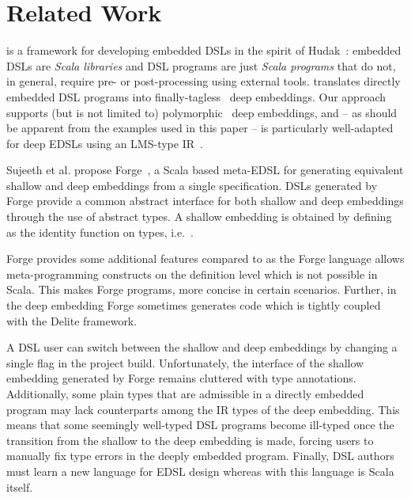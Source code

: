 \section{Related Work}
\label{sec:related-work}

\yy is a framework for developing embedded DSLs in the spirit of
Hudak~\cite{Hudak96csur,Hudak98sr}: embedded DSLs are \emph{Scala
  libraries} and DSL programs are just \emph{Scala programs} that do
not, in general, require pre- or post-processing using external tools.
\yy translates directly embedded DSL programs into
finally-tagless~\cite{carette_finally_2009} deep embeddings.  Our
approach supports (but is not limited to)
polymorphic~\cite{hofer_polymorphic_2008} deep embeddings, and -- as
should be apparent from the examples used in this paper -- is
particularly well-adapted for deep EDSLs using an LMS-type
IR~\cite{rompf_scala-virtualized:_2009,rompf_optimizing_2013}.

Sujeeth et al. propose Forge~\cite{forge}, a Scala based meta-EDSL for generating equivalent
shallow and deep embeddings from a single specification.  DSLs
generated by Forge provide a common abstract interface for both
shallow and deep embeddings through the use of abstract 
types.  A shallow embedding is obtained by defining  as the
identity function on types, i.e.\ .

Forge provides some additional features compared to \yy as the Forge language allows meta-programming
 constructs on the definition level which is not possible in Scala. This makes Forge programs, more
 concise in certain scenarios. Further, in the deep embedding
 Forge sometimes generates code which is tightly coupled with the Delite framework.

A DSL user can switch between the shallow and deep embeddings by
changing a single flag in the project build. Unfortunately, the interface of the shallow
embedding generated by Forge remains cluttered with  type
annotations. Additionally, some plain types that are admissible in a
directly embedded program may lack counterparts among the IR types of
the deep embedding.  This means that some seemingly well-typed DSL
programs become ill-typed once the transition from the shallow to the
deep embedding is made, forcing users to manually fix type errors in
the deeply embedded program. Finally, DSL authors must learn a new
language for EDSL design whereas with \yy this language is Scala
itself.

